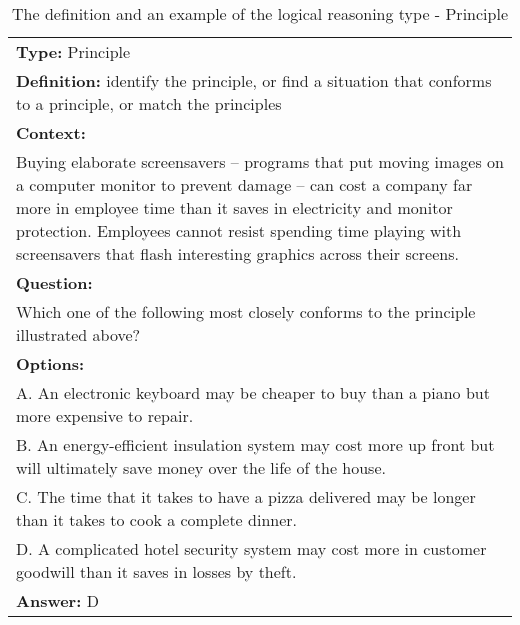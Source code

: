 \documentclass{article} \usepackage{iclr2020_conference,times}
\begin{document}
\begin{table}
	\small
	\centering
	\caption{The definition and an example of the logical reasoning type - Principle}
	\begin{tabular}{|p{}|}
		\hline
		{\bf Type: }Principle \\
		
		{\bf Definition: }identify the principle, or find a situation that conforms to a principle, or match the principles
		\\
		\hline
		{\bf Context:} \\Buying elaborate screensavers -- programs that put moving images on a computer monitor to prevent damage -- can cost a company far more in employee time than it saves in electricity and monitor protection. Employees cannot resist spending time playing with screensavers that flash interesting graphics across their screens.
		\\
		{\bf Question:}\\Which one of the following most closely conforms to the principle illustrated above?\\
		{\bf Options:}\\
			A. An electronic keyboard may be cheaper to buy than a piano but more expensive to repair.\\
			B. An energy-efficient insulation system may cost more up front but will ultimately save money over the life of the house.\\
			C. The time that it takes to have a pizza delivered may be longer than it takes to cook a complete dinner.\\
			D. A complicated hotel security system may cost more in customer goodwill than it saves in losses by theft.\\
		{\bf Answer: }D \\
		\hline
	\end{tabular}
	\label{tab:principle}
\end{table}
\end{document}
